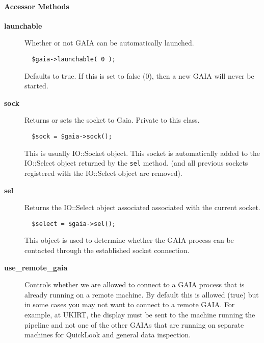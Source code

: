 \paragraph*{Accessor Methods\label{ORAC::Display::GAIA_Accessor_Methods}}
\begin{description}

\item[{\textbf{launchable}}] \mbox{}

Whether or not GAIA can be automatically launched.

\begin{verbatim}
  $gaia->launchable( 0 );
\end{verbatim}


Defaults to true. If this is set to false (0), then a new GAIA will
never be started.


\item[{\textbf{sock}}] \mbox{}

Returns or sets the socket to Gaia. Private to this class.

\begin{verbatim}
  $sock = $gaia->sock();
\end{verbatim}


This is usually IO::Socket object. This socket is automatically
added to the IO::Select object returned by the \texttt{sel} method.
(and all previous sockets registered with the IO::Select object
are removed).


\item[{\textbf{sel}}] \mbox{}

Returns the IO::Select object associated associated with the
current socket.

\begin{verbatim}
  $select = $gaia->sel();
\end{verbatim}


This object is used to determine whether the GAIA process can be
contacted through the established socket connection.


\item[{\textbf{use\_remote\_gaia}}] \mbox{}

Controls whether we are allowed to connect to a GAIA process that
is already running on a remote machine. By default this is allowed
(true) but in some cases you may not want to connect to a remote
GAIA. For example, at UKIRT, the display must be sent to the machine
running the pipeline and not one of the other GAIAs that are running
on separate machines for QuickLook and general data inspection.

\end{description}
